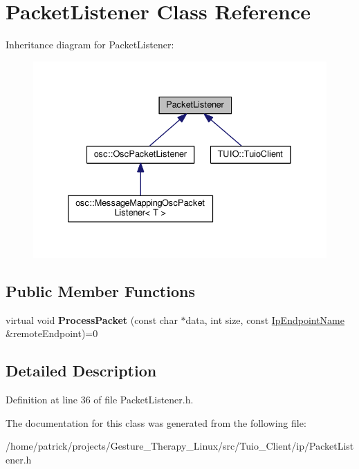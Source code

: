 \hypertarget{class_packet_listener}{}\section{Packet\+Listener Class Reference}
\label{class_packet_listener}


Inheritance diagram for Packet\+Listener\+:\nopagebreak
\begin{figure}[H]
\begin{center}
\leavevmode
\includegraphics[width=333pt]{class_packet_listener__inherit__graph}
\end{center}
\end{figure}
\subsection*{Public Member Functions}
\begin{DoxyCompactItemize}
\item 
\mbox{\label{class_packet_listener_a6a77fa7f6b34df1bf612438d6ec08ba5}} 
virtual void {\bfseries Process\+Packet} (const char $\ast$data, int size, const \hyperlink{class_ip_endpoint_name}{Ip\+Endpoint\+Name} \&remote\+Endpoint)=0
\end{DoxyCompactItemize}


\subsection{Detailed Description}


Definition at line 36 of file Packet\+Listener.\+h.



The documentation for this class was generated from the following file\+:\begin{DoxyCompactItemize}
\item 
/home/patrick/projects/\+Gesture\+\_\+\+Therapy\+\_\+\+Linux/src/\+Tuio\+\_\+\+Client/ip/Packet\+Listener.\+h\end{DoxyCompactItemize}
